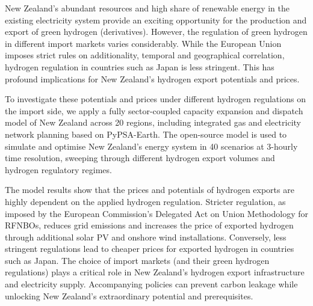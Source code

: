 New Zealand's abundant resources and high share of renewable energy in the existing electricity system provide an exciting opportunity for the production and export of green hydrogen (derivatives). However, the regulation of green hydrogen in different import markets varies considerably. While the European Union imposes strict rules on additionality, temporal and geographical correlation, hydrogen regulation in countries such as Japan is less stringent. This has profound implications for New Zealand's hydrogen export potentials and prices.

To investigate these potentials and prices under different hydrogen regulations on the import side, we apply a fully sector-coupled capacity expansion and dispatch model of New Zealand across 20 regions, including integrated gas and electricity network planning based on PyPSA-Earth. The open-source model is used to simulate and optimise New Zealand's energy system in 40 scenarios at 3-hourly time resolution, sweeping through different hydrogen export volumes and hydrogen regulatory regimes.

The model results show that the prices and potentials of hydrogen exports are highly dependent on the applied hydrogen regulation. Stricter regulation, as imposed by the European Commission's Delegated Act on Union Methodology for RFNBOs, reduces grid emissions and increases the price of exported hydrogen through additional solar PV and onshore wind installations. Conversely, less stringent regulations lead to cheaper prices for exported hydrogen in countries such as Japan. The choice of import markets (and their green hydrogen regulations) plays a critical role in New Zealand's hydrogen export infrastructure and electricity supply. Accompanying policies can prevent carbon leakage while unlocking New Zealand's extraordinary potential and prerequisites.
